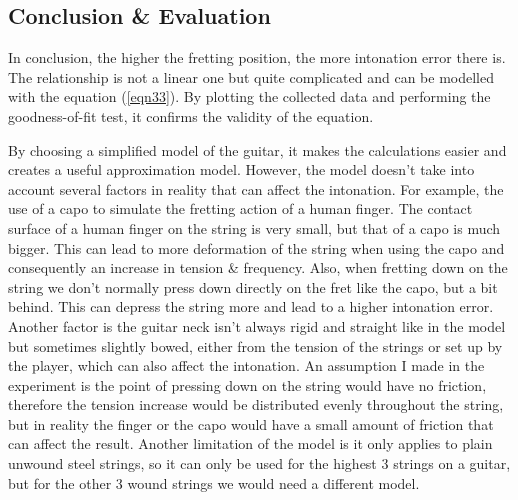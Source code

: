 \documentclass[11pt]{article}
\begin{document}
\begin{flushleft}
    \section{Conclusion \& Evaluation}
        In conclusion, the higher the fretting position, the more intonation error there is. The relationship is not a linear one but quite complicated and can be modelled with the equation (\ref{eqn33}). By plotting the collected data and performing the goodness-of-fit test, it confirms the validity of the equation. \par
        By choosing a simplified model of the guitar, it makes the calculations easier and creates a useful approximation model. However, the model doesn't take into account several factors in reality that can affect the intonation. For example, the use of a capo to simulate the fretting action of a human finger. The contact surface of a human finger on the string is very small, but that of a capo is much bigger. This can lead to more deformation of the string when using the capo and consequently an increase in tension \& frequency. Also, when fretting down on the string we don't normally press down directly on the fret like the capo, but a bit behind. This can depress the string more and lead to a higher intonation error. Another factor is the guitar neck isn't always rigid and straight like in the model but sometimes slightly bowed, either from the tension of the strings or set up by the player, which can also affect the intonation. An assumption I made in the experiment is the point of pressing down on the string would have no friction, therefore the tension increase would be distributed evenly throughout the string, but in reality the finger or the capo would have a small amount of friction that can affect the result. Another limitation of the model is it only applies to plain unwound steel strings, so it can only be used for the highest 3 strings on a guitar, but for the other 3 wound strings we would need a different model.\par


\end{flushleft}
\end{document}
